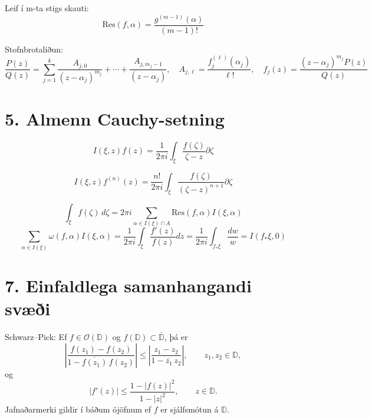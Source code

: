 \bigskip

\noindent Leif í m-ta stigs skauti:
\[\textrm{Res}(f,\alpha)=\frac{g^{(m-1)}(\alpha)}{(m-1)!}\]

\bigskip
\noindent Stofnbrotaliðun:
\[\frac{P(z)}{Q(z)}=\sum_{j=1}^k\frac{A_{j,0}}{(z-\alpha_j)^{m_j}}+\cdots+\frac{A_{j,m_j-1}}{(z-\alpha_j)},\quad A_{j,\ell}=\frac{f_j^{(\ell)}(\alpha_j)}{\ell!},\quad f_j(z)=\frac{(z-\alpha_j)^{m_j}P(z)}{Q(z)}\]

\section*{5. Almenn Cauchy-setning}
\begin{minipage}{0.5\linewidth}
\[
I(\xi, z)f(z) = \frac{1}{2\pi i} \int_{\xi} \frac{f(\zeta)}{\zeta - z} \partial \zeta
\]
\end{minipage}
\begin{minipage}{0.5\linewidth}
\[
I(\xi, z)f ^ {(n)} (z) = \frac{n!}{2\pi i} \int_{\xi} \frac{f(\zeta)}{(\zeta - z) ^ {n+1}} \partial \zeta
\]
\end{minipage}

\bigskip
\[
\int_{\xi} f(\zeta)\,d\zeta = 2 \pi i \sum_{\alpha \in I(\xi)\cap A} \text{Res} (f, \alpha)I(\xi, \alpha)
\]
\bigskip
\[
\sum_{\alpha \in I(\xi)}\omega(f,\alpha)I(\xi,\alpha)=\frac{1}{2\pi i}\int_{\xi}\frac{f'(z)}{f(z)}dz=\frac{1}{2\pi i}\int_{f_*\xi}\frac{dw}{w}=I(f_*\xi, 0)
\]

\section*{7. Einfaldlega samanhangandi svæði}
Schwarz--Pick: Ef $f \in \mathcal{O}(\mathbb{D})$ og $f(\mathbb{D}) \subset \overline{\mathbb{D}}$, þá er
\[
\left|
  \frac{f(z_1)-f(z_2)}{1-\overline{f(z_1)}\,f(z_2)}
\right|
\le
\left|
  \frac{z_1-z_2}{1-\overline{z_1}\,z_2}
\right|,
\qquad z_1,z_2 \in \mathbb{D},
\]
og
\[
|f'(z)|
\le
\frac{1-|f(z)|^2}{1-|z|^2},
\qquad z \in \mathbb{D}.
\]
Jafnaðarmerki gildir í báðum ójöfnum ef $f$ er sjálfsmótun á $\mathbb{D}$.
